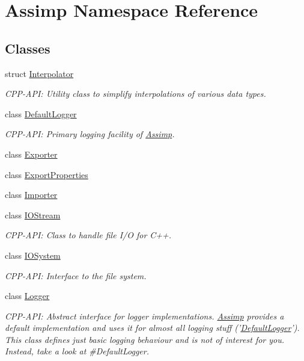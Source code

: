 \hypertarget{namespace_assimp}{\section{Assimp Namespace Reference}
\label{namespace_assimp}
}
\subsection*{Classes}
\begin{DoxyCompactItemize}
\item 
struct \hyperlink{struct_assimp_1_1_interpolator}{Interpolator}
\begin{DoxyCompactList}\small\item\em C\-P\-P-\/\-A\-P\-I\-: Utility class to simplify interpolations of various data types. \end{DoxyCompactList}\item 
class \hyperlink{class_assimp_1_1_default_logger}{Default\-Logger}
\begin{DoxyCompactList}\small\item\em C\-P\-P-\/\-A\-P\-I\-: Primary logging facility of \hyperlink{namespace_assimp}{Assimp}. \end{DoxyCompactList}\item 
class \hyperlink{class_assimp_1_1_exporter}{Exporter}
\item 
class \hyperlink{class_assimp_1_1_export_properties}{Export\-Properties}
\item 
class \hyperlink{class_assimp_1_1_importer}{Importer}
\item 
class \hyperlink{class_assimp_1_1_i_o_stream}{I\-O\-Stream}
\begin{DoxyCompactList}\small\item\em C\-P\-P-\/\-A\-P\-I\-: Class to handle file I/\-O for C++. \end{DoxyCompactList}\item 
class \hyperlink{class_assimp_1_1_i_o_system}{I\-O\-System}
\begin{DoxyCompactList}\small\item\em C\-P\-P-\/\-A\-P\-I\-: Interface to the file system. \end{DoxyCompactList}\item 
class \hyperlink{class_assimp_1_1_logger}{Logger}
\begin{DoxyCompactList}\small\item\em C\-P\-P-\/\-A\-P\-I\-: Abstract interface for logger implementations. \hyperlink{namespace_assimp}{Assimp} provides a default implementation and uses it for almost all logging stuff ('\hyperlink{class_assimp_1_1_default_logger}{Default\-Logger}'). This class defines just basic logging behaviour and is not of interest for you. Instead, take a look at \#\-Default\-Logger. \end{DoxyCompactList}\item 

\end{DoxyCompactItemize}
